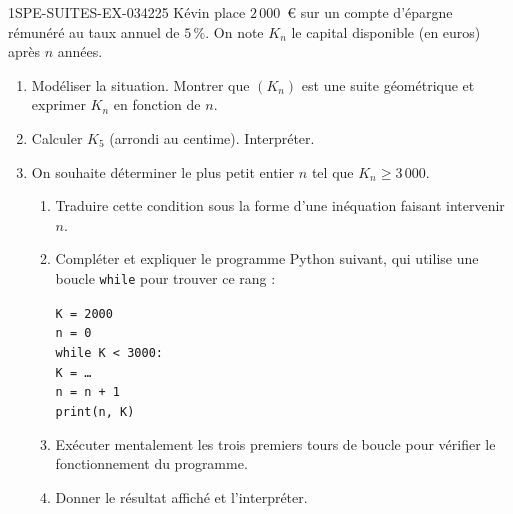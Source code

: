 \begin{exercice}{1SPE-SUITES-EX-034}{2}{25}
Kévin place $2\,000$~\euro{} sur un compte d'épargne rémunéré au taux annuel de $5\,\%$. On note $K_n$ le capital disponible (en euros) après $n$ années.

\begin{enumerate}
  \item Modéliser la situation. Montrer que $(K_n)$ est une suite géométrique et exprimer $K_n$ en fonction de $n$.

  \item Calculer $K_5$ (arrondi au centime). Interpréter.

  \item On souhaite déterminer le plus petit entier $n$ tel que $K_n \geq 3\,000$.
  \begin{enumerate}
    \item Traduire cette condition sous la forme d'une inéquation faisant intervenir $n$.
    \item Compléter et expliquer le programme Python suivant, qui utilise une boucle \texttt{while} pour trouver ce rang :

\medskip
\texttt{K = 2000}\\
\texttt{n = 0}\\
\texttt{while K < 3000:}\\
\hspace*{1.5em}\texttt{K = \ldots}\\
\hspace*{1.5em}\texttt{n = n + 1}\\
\texttt{print(n, K)}

\medskip
    \item Exécuter mentalement les trois premiers tours de boucle pour vérifier le fonctionnement du programme.
    \item Donner le résultat affiché et l'interpréter.
  \end{enumerate}
\end{enumerate}
\end{exercice}
